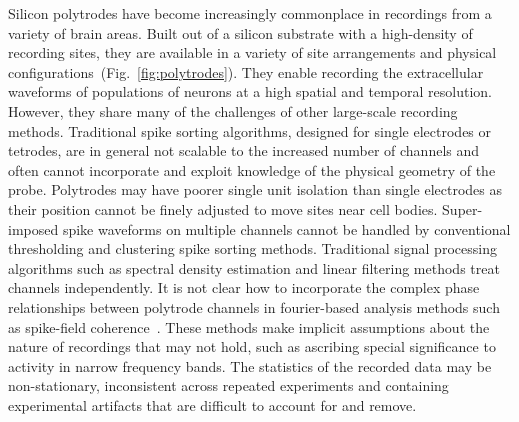 





Silicon polytrodes have become increasingly commonplace in recordings
from a variety of brain areas. Built out of a silicon substrate with a
high-density of recording sites, they are available in a variety of
site arrangements and physical
configurations~(Fig.~\ref{fig:polytrodes}). They enable recording the
extracellular waveforms of populations of neurons at a high spatial
and temporal resolution. However, they share many of the challenges of
other large-scale recording methods. Traditional spike sorting
algorithms, designed for single electrodes or tetrodes, are in general
not scalable to the increased number of channels and often cannot
incorporate and exploit knowledge of the physical geometry of the
probe. Polytrodes may have poorer single unit isolation than single
electrodes as their position cannot be finely adjusted to move sites
near cell bodies. Super-imposed spike waveforms on multiple channels
cannot be handled by conventional thresholding and clustering spike
sorting methods. Traditional signal processing algorithms such as
spectral density estimation and linear filtering methods treat
channels independently. It is not clear how to incorporate the complex
phase relationships between polytrode channels in fourier-based
analysis methods such as spike-field
coherence~\cite{Bokil:2010ly}. These methods make implicit assumptions
about the nature of recordings that may not hold, such as ascribing
special significance to activity in narrow frequency bands. The
statistics of the recorded data may be non-stationary, inconsistent
across repeated experiments and containing experimental artifacts that
are difficult to account for and remove. 

